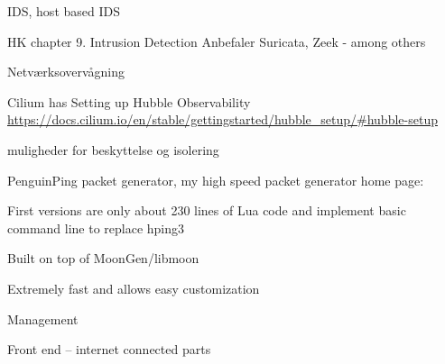 \documentclass[Screen16to9,17pt]{foils}
\begin{document}

\begin{list2}
\item IDS, host based IDS
\item HK chapter 9. Intrusion Detection
Anbefaler Suricata, Zeek - among others
\end{list2}



\begin{list2}
\item
\end{list2}


\begin{list2}
\item Netværksovervågning
\item Cilium has Setting up Hubble Observability \\
\url{https://docs.cilium.io/en/stable/gettingstarted/hubble_setup/#hubble-setup}
\end{list2}


\begin{list2}
\item muligheder for beskyttelse og isolering
\end{list2}



\begin{list2}
\item PenguinPing packet generator, my high speed packet generator
home page: 
\item First versions are only about 230 lines of Lua code and implement basic command line to replace hping3
\item Built on top of MoonGen/libmoon 
\end{list2}

\centerline{Extremely fast and allows easy customization}



\begin{list2}
\item
\end{list2}
Management

Front end -- internet connected parts
\end{document}
